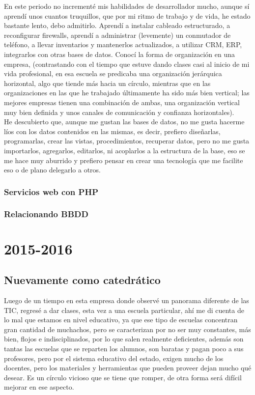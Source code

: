 \documentclass[12pt,spanish,lettersize]{book}
\begin{document}
En este periodo no incrementé mis habilidades de desarrollador mucho, aunque sí aprendí unos cuantos truquillos, que por mi ritmo de trabajo y de vida, he estado bastante lento, debo admitirlo. Aprendí a instalar cableado estructurado, a reconfigurar firewalls, aprendí a administrar (levemente) un conmutador de teléfono, a llevar inventarios y mantenerlos actualizados, a utilizar CRM, ERP, integrarlos con otras bases de datos. Conocí la forma de organización en una empresa, (contrastando con el tiempo que estuve dando clases casi al inicio de mi vida profesional, en esa escuela se predicaba una organización jerárquica horizontal, algo que tiende más hacia un círculo, mientras que en las organizaciones en las que he trabajado últimamente ha sido más bien vertical; las mejores empresas tienen una combinación de ambas, una organización vertical muy bien definida y unos canales de comunicación y confianza horizontales).\\

He descubierto que, aunque me gustan las bases de datos, no me gusta hacerme líos con los datos contenidos en las mismas, es decir, prefiero diseñarlas, programarlas, crear las vistas, procedimientos, recuperar datos, pero no me gusta importarlos, agregarlos, editarlos, ni acoplarlos a la estructura de la base, eso se me hace muy aburrido y prefiero pensar en crear una tecnología que me facilite eso o de plano delegarlo a otros.\\
\subsection{Servicios web con PHP}
\subsection{Relacionando BBDD}
\chapter{2015-2016}
\section{Nuevamente como catedrático}

Luego de un tiempo en esta empresa donde observé un panorama diferente de las TIC, regresé a dar clases, esta vez a una escuela particular, ahí me di cuenta de lo mal que estamos en nivel educativo, ya que ese tipo de escuelas concentran gran cantidad de muchachos, pero se caracterizan por no ser muy constantes, más bien, flojos e indisciplinados, por lo que salen realmente deficientes, además son tantas las escuelas que se reparten los alumnos, son baratas y pagan poco a sus profesores, pero por el sistema educativo del estado, exigen mucho de los docentes, pero los materiales y herramientas que pueden proveer dejan mucho qué desear. Es un círculo vicioso que se tiene que romper, de otra forma será difícil mejorar en ese aspecto.\\
\end{document}

